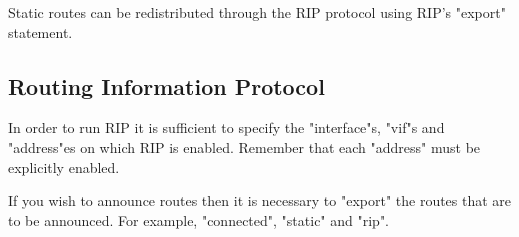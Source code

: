 \documentclass[11pt]{article}
\begin{document}
\vspace{0.1in}
\noindent{}
\vspace{0.1in}

Static routes can be redistributed through the RIP protocol using RIP's
"export" statement.

\subsection{Routing Information Protocol}

In order to run RIP it is sufficient to specify the "interface"s, "vif"s
and "address"es on which RIP is enabled. Remember that each "address"
must be explicitly enabled.

If you wish to announce routes then it is necessary to "export" the
routes that are to be announced. For example, "connected", "static" and
"rip".
\end{document}
